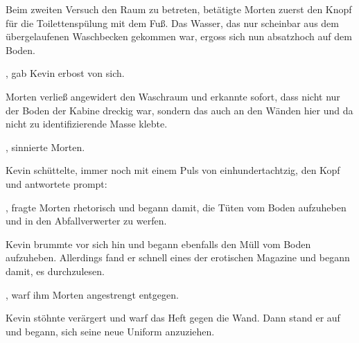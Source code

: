 \par

Beim zweiten Versuch den Raum zu betreten, betätigte Morten zuerst den Knopf für die Toilettenspülung mit dem Fuß. Das Wasser, das nur scheinbar aus dem übergelaufenen Waschbecken gekommen war, ergoss sich nun absatzhoch auf dem Boden.

\par

, gab Kevin erbost von sich. 

\par

Morten verließ angewidert den Waschraum und erkannte sofort, dass nicht nur der Boden der Kabine dreckig war, sondern das auch an den Wänden hier und da nicht zu identifizierende Masse klebte.

\par

, sinnierte Morten.

\par

Kevin schüttelte, immer noch mit einem Puls von einhundertachtzig, den Kopf und antwortete prompt: 

\par

, fragte Morten rhetorisch und begann damit, die Tüten vom Boden aufzuheben und in den Abfallverwerter zu werfen.

\par

Kevin brummte vor sich hin und begann ebenfalls den Müll vom Boden aufzuheben. Allerdings fand er schnell eines der erotischen Magazine und begann damit, es durchzulesen.

\par

, warf ihm Morten angestrengt entgegen.

\par

Kevin stöhnte verärgert und warf das Heft gegen die Wand. Dann stand er auf und begann, sich seine neue Uniform anzuziehen.

